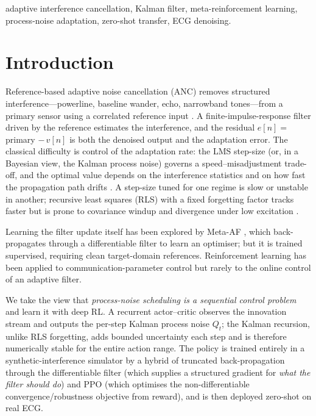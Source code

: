 \documentclass[journal]{IEEEtran}
\begin{document}
\begin{IEEEkeywords}
adaptive interference cancellation, Kalman filter, meta-reinforcement learning,
process-noise adaptation, zero-shot transfer, ECG denoising.
\end{IEEEkeywords}

\section{Introduction}\label{sec:intro}

Reference-based adaptive noise cancellation (ANC) removes structured
interference---powerline, baseline wander, echo, narrowband
tones---from a primary sensor using a correlated reference input
\cite{widrow1975anc,haykin2014adaptive,sayed2003fundamentals}. A finite-impulse-response
filter driven by the reference estimates the interference, and the residual
$e[n]=$ primary $-\,\hat{v}[n]$ is both the denoised output and the adaptation
error. The classical difficulty is control of the adaptation rate: the LMS
step-size (or, in a Bayesian view, the Kalman process noise) governs a
speed--misadjustment trade-off, and the optimal value depends on the
interference statistics and on how fast the propagation path drifts
\cite{kwong1992variable,aboulnasr1997robust}. A step-size tuned for one regime
is slow or unstable in another; recursive least squares (RLS) with a fixed
forgetting factor tracks faster but is prone to covariance windup and
divergence under low excitation \cite{haykin2014adaptive}.

Learning the filter update itself has been explored by Meta-AF
\cite{casebeer2022metaaf}, which back-propagates through a differentiable
filter to learn an optimiser; but it is trained supervised, requiring clean
target-domain references. Reinforcement learning has been applied to
communication-parameter control \cite{calabrese2018learning,mismar2019deep}
but rarely to the online control of an adaptive filter.

We take the view that \emph{process-noise scheduling is a sequential control
problem} and learn it with deep RL. A recurrent actor--critic observes the
innovation stream and outputs the per-step Kalman process noise $Q_t$; the
Kalman recursion, unlike RLS forgetting, adds bounded uncertainty each step
and is therefore numerically stable for the entire action range. The policy is
trained entirely in a synthetic-interference simulator by a hybrid of
truncated back-propagation through the differentiable filter (which supplies a
structured gradient for \emph{what the filter should do}) and PPO (which
optimises the non-differentiable convergence/robustness objective from
reward), and is then deployed zero-shot on real ECG.
\end{document}
